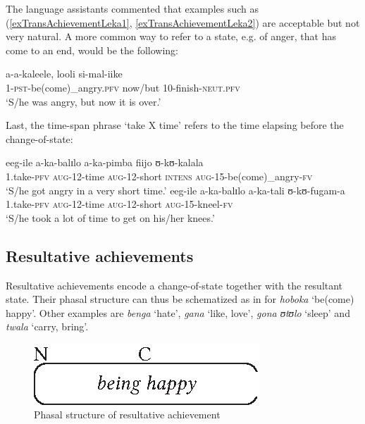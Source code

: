 The language assistants commented that examples such as (\ref{exTransAchievementLeka1}, \ref{exTransAchievementLeka2}) are acceptable but not very natural. A more common way to refer to a state, e.g. of anger, that has come to an end, would be the following:

\begin{exe}
\ex 
\begin{xlist}
\gll a-a-kaleele, looli si-mal-iike\\
1-\textsc{pst}-be(come)\_angry.\textsc{pfv} now/but 10-finish-\textsc{neut.pfv}\\
\glt \lq S/he was angry, but now it is over.'
\end{xlist}
\end{exe}

Last, the time-span phrase \lq take X time' refers to the time elapsing before the change-of-state:

\begin{exe}
\ex  \gll eeg-ile a-ka-balɪlo a-ka-pimba fiijo ʊ-kʊ-kalala\\
1.take-\textsc{pfv} \textsc{aug}-12-time \textsc{aug}-12-short \textsc{intens} \textsc{aug}-15-be(come)\_angry-\textsc{fv}\\
\glt \lq S/he got angry in a very short time.'
\ex  \gll eeg-ile a-ka-balɪlo a-ka-tali ʊ-kʊ-fugam-a\\
1.take-\textsc{pfv} \textsc{aug}-12-time \textsc{aug}-12-short \textsc{aug}-15-kneel-\textsc{fv}\\
\glt \lq S/he took a lot of time to get on his/her knees.'
\end{exe}
\subsection{Resultative achievements}\label{VerbalClassResultativeAchievement}
Resultative achievements encode a change-of-state together with the resultant state. Their phasal structure can thus be schematized as in  for \textit{hoboka} `be(come) happy'. Other examples are \textit{benga} \lq hate', \textit{gana} \lq like, love', \textit{gona ʊtʊlo} \lq sleep' and \textit{twala} \lq carry, bring'.

\begin{figure}[h]
\begin{center}
\includegraphics{figures/GrafikResultativeAchievement.eps}
\caption{Phasal structure of resultative achievement}
\label{FigureResultativeAchievement}
\end{center}
\end{figure}

